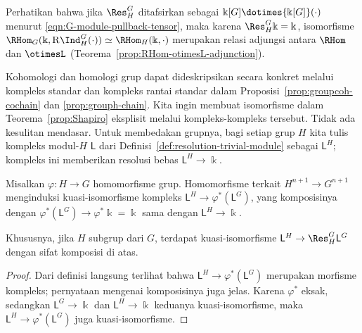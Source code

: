 Perhatikan bahwa jika $\Res^G_H$ ditafsirkan sebagai
$\Bbbk[G]\dotimes{\Bbbk[G]}(\cdot)$ menurut
\eqref{eqn:G-module-pullback-tensor}, maka karena
$\Res^G_H\Bbbk=\Bbbk$, isomorfisme
$\RHom_G(\Bbbk,\mathrm{R}\Ind^G_H(\cdot))
\simeq\RHom_H(\Bbbk,\cdot)$ merupakan relasi adjungsi antara $\RHom$ dan
$\otimesL$ (Teorema~\ref{prop:RHom-otimesL-adjunction}).

Kohomologi dan homologi grup dapat dideskripsikan secara konkret melalui
kompleks standar dan kompleks rantai standar dalam
Proposisi~\ref{prop:groupcoh-cochain} dan \ref{prop:grouph-chain}. Kita ingin
membuat isomorfisme dalam Teorema~\ref{prop:Shapiro} eksplisit melalui
kompleks-kompleks tersebut. Tidak ada kesulitan mendasar. Untuk membedakan
grupnya, bagi setiap grup $H$ kita tulis kompleks modul-$H$ $\mathsf{L}$ dari
Definisi~\ref{def:resolution-trivial-module} sebagai $\mathsf{L}^H$; kompleks
ini memberikan resolusi bebas $\mathsf{L}^H\to\Bbbk$.

\begin{lemma}\label{prop:Shapiro-alpha-beta}
	Misalkan $\varphi:H\to G$ homomorfisme grup. Homomorfisme terkait
	$H^{n+1}\to G^{n+1}$ menginduksi kuasi-isomorfisme kompleks
	$\mathsf{L}^H\to\varphi^*(\mathsf{L}^G)$, yang komposisinya dengan
	$\varphi^*(\mathsf{L}^G)\to\varphi^*\Bbbk=\Bbbk$ sama dengan
	$\mathsf{L}^H\to\Bbbk$.

	Khususnya, jika $H$ subgrup dari $G$, terdapat kuasi-isomorfisme
	$\mathsf{L}^H\to\Res^G_H\mathsf{L}^G$ dengan sifat komposisi di atas.
\end{lemma}
\begin{proof}
	Dari definisi langsung terlihat bahwa
	$\mathsf{L}^H\to\varphi^*(\mathsf{L}^G)$ merupakan morfisme kompleks;
	pernyataan mengenai komposisinya juga jelas. Karena $\varphi^*$ eksak,
	sedangkan $\mathsf{L}^G\to\Bbbk$ dan $\mathsf{L}^H\to\Bbbk$ keduanya
	kuasi-isomorfisme, maka
	$\mathsf{L}^H\to\varphi^*(\mathsf{L}^G)$ juga kuasi-isomorfisme.
\end{proof}

